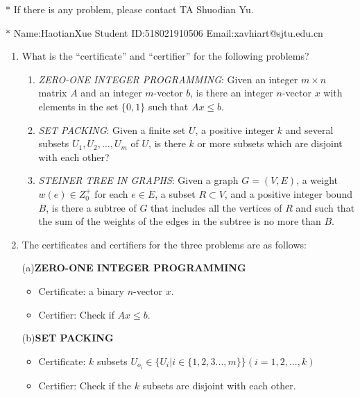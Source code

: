 \documentclass[12pt,a4paper]{article}
\makeatletter
\newtheorem*{solution}{Solution}
\theoremstyle{definition}
\renewenvironment{solution}[1][Solution] {\par\pushQED{\qed}\normalfont\topsep6\p@\@plus6\p@\relax\trivlist\item[\hskip\labelsep\bfseries#1\@addpunct{.}]\ignorespaces}{\popQED\endtrivlist\@endpefalse} \makeatother
\makeatother
\begin{document}
\noindent
{}

\noindent{}
\begin{center}
\footnotesize{\color{red}$*$ If there is any problem, please contact TA Shuodian Yu. }

\footnotesize{\color{blue}$*$ Name:HaotianXue \quad Student ID:518021910506 \quad Email:xavhiart@sjtu.edu.cn}
\end{center}
\begin{enumerate}
	\item What is the ``certificate'' and ``certifier'' for the following problems?
	\begin{enumerate}
		\item \emph{ZERO-ONE INTEGER PROGRAMMING}: Given an integer $m \times n$ matrix $A$ and an integer $m$-vector $b$, is there an integer $n$-vector $x$ with elements in the set $\{0, 1\}$ such that $Ax \leq b$.
		\item \emph{SET PACKING}: Given a finite set $U$, a positive integer $k$ and several subsets $U_1, U_2, \ldots, U_m$ of $U$, is there $k$ or more subsets which are disjoint with each other?
		\item \emph{STEINER TREE IN GRAPHS}: Given a graph $G=(V,E)$, a weight $w(e)\in Z_0^{+}$ for each $e\in E$, a subset $R \subset V$, and a positive integer bound $B$, is there a subtree of $G$ that includes all the vertices of $R$ and such that the sum of the weights of the edges in the subtree is no more than $B$.
	\end{enumerate}
	   
	\begin{solution}
		The certificates and certifiers for the three problems are as follows:
		
		(a)\textbf{ZERO-ONE INTEGER PROGRAMMING}
		  \begin{itemize}
			  \item Certificate: a binary $n$-vector $x$.
			  \item Certifier: Check if $Ax\leq b$.
		  \end{itemize}

		(b)\textbf{SET PACKING}
		\begin{itemize}
			\item Certificate: $k$ subsets $U_{o_i} \in \{U_i|i \in \{1,2,3...,m\}\}(i=1, 2, ..., k)$ 
			\item Certifier: Check if the $k$ subsets are disjoint with each other.
		\end{itemize}


\end{solution}
\end{enumerate}
\end{document}
